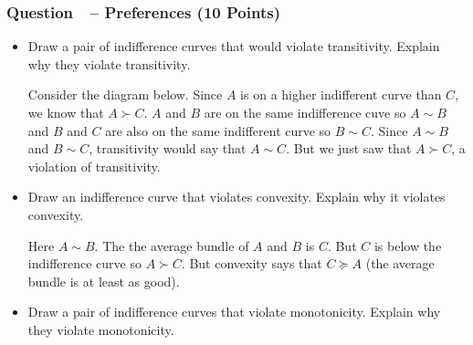 \documentclass[12pt]{article}
\newcounter{question}[section]
\newcommand{\question}[1]{\refstepcounter{question}
  \subsubsection*{Question~\thequestion~-- #1}}
\begin{document}
\question{Preferences (10 Points)}
\begin{itemize}
  \item Draw a pair of indifference curves that would violate transitivity.
    Explain why they violate transitivity.

    \textcolor{solution-color}{
      Consider the diagram below. Since $A$ is on a higher indifferent curve
      than $C$, we know that $A\succ C$. $A$ and $B$ are on the same
      indifference cuve so $A\sim B$ and $B$ and $C$ are also on the same
      indifferent curve so $B\sim C$. Since $A\sim B$ and $B\sim C$,
      transitivity would say that $A\sim C$. But we just saw that $A\succ C$, a
      violation of transitivity.
    }

    \textcolor{solution-color}{
      \begin{center}
      \end{center}
    }


  \item Draw an indifference curve that violates convexity. Explain why it
    violates convexity.

    \textcolor{solution-color}{
      Here $A\sim B$. The the average bundle of $A$ and $B$ is $C$. But $C$ is
      below the indifference curve so $A\succ C$. But convexity says that
      $C\succeq A$ (the average bundle is at least as good).
    }

    \textcolor{solution-color}{
      \begin{center}
      \end{center}
    }
  \item Draw a pair of indifference curves that violate monotonicity. Explain
    why they violate monotonicity.


\end{itemize}
\end{document}
